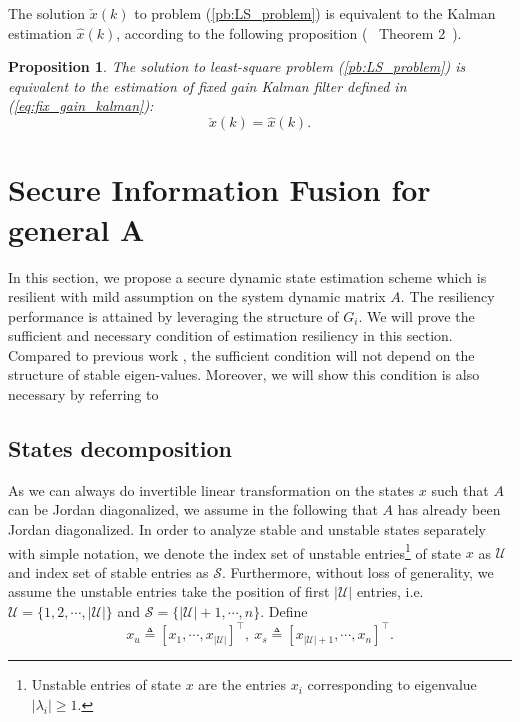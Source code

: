 \documentclass[journal]{IEEEtran}
\newcommand{\Uc}{{\mathcal{U}}}
\newcommand{\Sc}{{\mathcal{S}}}
\newtheorem{proposition}{\textbf{Proposition}}
\begin{document}
	The solution $\check{x}(k)$ to problem (\ref{pb:LS_problem}) is equivalent to the Kalman estimation $\hat{x}(k)$, according to the following proposition (~\cite{liuxinghua-IFAC} Theorem 2~).
	\begin{proposition}
		The solution to least-square problem (\ref{pb:LS_problem}) is equivalent to the estimation of fixed gain Kalman filter defined in (\ref{eq:fix_gain_kalman}):
		\begin{equation}\label{eq:LSP_result=decomp}
			\check{x}(k)=\hat{x}(k).  %
		\end{equation}
	\end{proposition}
	
	\section{Secure Information Fusion for general A}\label{sec:secure_info_fuse}
	In this section, we propose a secure dynamic state estimation scheme which is resilient with mild assumption on the system dynamic matrix $A$.
	The resiliency performance is attained by leveraging the structure of $G_i$.
	We will prove the sufficient and necessary condition of estimation resiliency in this section.
	Compared to previous work \cite{liuxinghua-IFAC}, the sufficient condition will not depend on the structure of stable eigen-values. Moreover, we will show this condition is also necessary by referring to \cite{yorie}
	
	
	\subsection{States decomposition}\label{subsec:transform}
	
	As we can always do invertible linear transformation on the states $x$ such that $A$ can be Jordan diagonalized, we assume in the following that $A$ has already been Jordan diagonalized. 
	In order to analyze stable and unstable states separately with simple notation, we denote the index set of unstable entries\footnote{Unstable entries of state $x$ are the entries $x_i$ corresponding to eigenvalue $|\lambda_i| \geq1$.} of state $x$ as $\Uc$ and index set of stable entries as $\Sc$. 
	Furthermore, without loss of generality, we assume the unstable entries take the position of first $|\Uc|$ entries, i.e. $\Uc=\{1,2,\cdots,|\Uc|\}$ and $\Sc=\{|\Uc|+1,\cdots,n\}$.
	Define 
	\begin{equation}\label{eq:def_x_u}
		x_u\triangleq [x_1,\cdots,x_{|\Uc|}]^\top, \ x_s\triangleq [x_{|\Uc|+1},\cdots,x_{n}]^\top.
	\end{equation}
	
\end{document}
